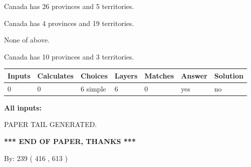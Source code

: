 \documentclass[12pt]{article}
\begin{document}
 
Canada has  26 provinces and  5 territories.
 
 
Canada has   4 provinces and  19 territories.
 
 
 None of above.
 
 
\noindent{}
 
 
Canada has 10  provinces and 3 territories.
 
 
\noindent{}
 
 
   
   
   
   
\noindent\begin{tabular}{|l|l|l|l|l|l|l|}
 \hline
Inputs & Calculates & Choices & Layers & Matches & Answer & Solution \\ \hline
 0  & 
 0  & 
 6
  simple  
  & 
 6  & 
 0  & 
  yes & 
  no 
  \\ \hline
 \end{tabular}
   
   
   
   
\noindent{}
   
   
   
   
\noindent\vspace{0.1in}\hspace{-0.08in} {\textbf{\Large{All inputs: }}}
   
   
   
   
   
   
 \vspace{0.2in}
 
   
   
\vspace{2.0in} PAPER TAIL GENERATED.
   
   
   
   
\vspace{1.0in} 
{\textbf{\large{ *** END OF PAPER, THANKS *** }}} 
   
   
\hspace{1.0in} By: 
 239 ( 416 ,  613 )
   
   
   
   
\newpage 
\setcounter{page}{ 
   597001 } 
   
   
   
\end{document}

